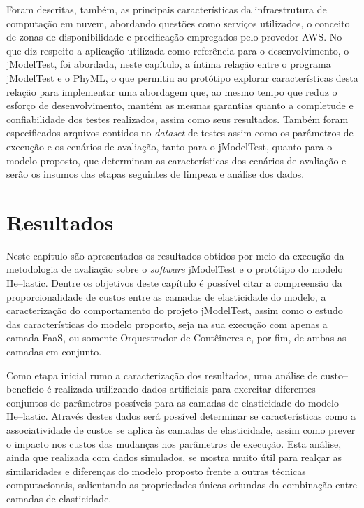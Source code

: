 \documentclass[english,brazilian]{UNISINOSmonografia} %
\begin{document}
Foram descritas, também, as principais características da infraestrutura de computação em nuvem, abordando questões como serviços utilizados, o conceito de zonas de disponibilidade e precificação empregados pelo provedor AWS.
%
No que diz respeito a aplicação utilizada como referência para o desenvolvimento, o jModelTest, foi abordada, neste capítulo, a íntima relação entre o programa jModelTest e o PhyML, o que permitiu ao protótipo explorar características desta relação para implementar uma abordagem que, ao mesmo tempo que reduz o esforço de desenvolvimento, mantém as mesmas garantias quanto a completude e confiabilidade dos testes realizados, assim como seus resultados.
%
Também foram especificados arquivos contidos no \textit{dataset} de testes assim como os parâmetros de execução e os cenários de avaliação, tanto para o jModelTest, quanto para o modelo proposto, que determinam as características dos cenários de avaliação e serão os insumos das etapas seguintes de limpeza e análise dos dados.







\chapter{Resultados}
\label{ch:resultados}




Neste capítulo são apresentados os resultados obtidos por meio da execução da metodologia de avaliação sobre o \textit{software} jModelTest e o protótipo do modelo \textsf{He}--lastic.
%
Dentre os objetivos deste capítulo é possível citar a compreensão da proporcionalidade de custos entre as camadas de elasticidade do modelo, a caracterização do comportamento do projeto jModelTest, assim como o estudo das características do modelo proposto, seja na sua execução com apenas a camada FaaS, ou somente Orquestrador de Contêineres e, por fim, de ambas as camadas em conjunto.



Como etapa inicial rumo a caracterização dos resultados, uma análise de custo--benefício é realizada utilizando dados artificiais para exercitar diferentes conjuntos de parâmetros possíveis para as camadas de elasticidade do modelo \textsf{He}--lastic.
%
Através destes dados será possível determinar se características como a associatividade de custos se aplica às camadas de elasticidade, assim como prever o impacto nos custos das mudanças nos parâmetros de execução.
%
Esta análise, ainda que realizada com dados simulados, se mostra muito útil para realçar as similaridades e diferenças do modelo proposto frente a outras técnicas computacionais, salientando as propriedades únicas oriundas da combinação entre camadas de elasticidade.
\end{document}
